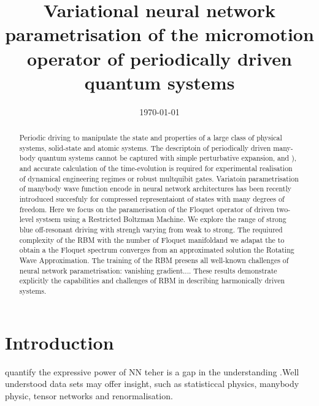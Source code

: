 \documentclass[pra,twocolumn,showkeys,preprintnumbers, amsmath,amssymb, aps,A4paper]{revtex4-1}
\begin{document}
\title{Variational neural network parametrisation of the micromotion operator of periodically driven quantum systems}



\date{\today}
\begin{abstract}
Periodic driving to manipulate the state and properties of a large class of physical systems, solid-state and atomic systems. The descriptoin of periodically driven many-body quantum systems cannot be captured with simple perturbative expansion, and ), and accurate calculation of the time-evolution is required for experimental realisation of dynamical engineering regimes  or robust multquibit gates. Variatoin parametrisation of manybody wave function encode in neural network architectures has been recently introduced succesfuly for compressed representaiont of states with many degrees of freedom. Here we focus on the paramerisation of the Floquet operator of driven two-level systsem using a Restricted Boltzman Machine. We explore the range of strong blue off-resonant driving with strengh varying from weak to strong. The requiured complexity of the RBM with the number of Floquet manifoldand we adapat the to obtain a the Floquet spectrum converges from an approximated solution the Rotating Wave Approximation. The training of the RBM presens all well-known challenges of neural network parametrisation: vanishing gradient.... These results demonstrate explicitly the capabilities and challenges of RBM in describing harmonically driven systems.
\end{abstract}

 
\maketitle


\section{\label{sec:Introduction} Introduction}



quantify the expressive power of NN teher is a gap in the understanding .Well understood data sets may offer insight, such as statisticcal physics, manybody physic, tensor networks and renormalisation.
\end{document}
